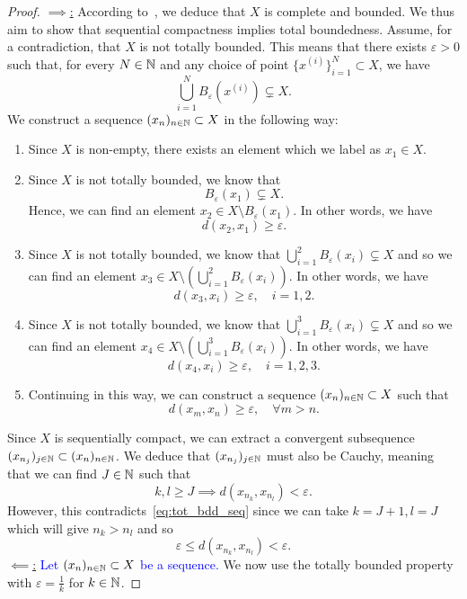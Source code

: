 \begin{proof}
	\ul{$\implies$:} According to~, we deduce that $X$ is complete and bounded. We thus aim to show that sequential compactness implies total boundedness. Assume, for a contradiction, that $X$ is not totally bounded. This means that there exists $\varepsilon>0$ such that, for every $N\in\mathbb{N}$ and any choice of point $\{x^{(i)}\}_{i=1}^N\subset X$, we have
	\[
	\bigcup_{i=1}^NB_\varepsilon(x^{(i)}) \subsetneq X.
	\]
	We construct a sequence $(x_n)_{n\in\mathbb{N}}\subset X$ in the following way:
	\begin{enumerate}
	\item Since $X$ is non-empty, there exists an element which we label as $x_1\in X$.
	\item Since $X$ is not totally bounded, we know that
	\[
	B_\varepsilon(x_1)\subsetneq X.
	\]
	Hence, we can find an element $x_2 \in X \setminus B_\varepsilon(x_1)$. In other words, we have
	\[
	d(x_2,x_1)\ge \varepsilon.
	\]
	\item Since $X$ is not totally bounded, we know that $\bigcup_{i=1}^2B_\varepsilon(x_i) \subsetneq X$ and so we can find an element $x_3\in X\setminus (\bigcup_{i=1}^2B_\varepsilon(x_i))$. In other words, we have
	\[
	d(x_3,x_i) \ge \varepsilon,\quad i=1,2.
	\]
	\item Since $X$ is not totally bounded, we know that $\bigcup_{i=1}^3B_\varepsilon(x_i) \subsetneq X$ and so we can find an element $x_4 \in X\setminus\left(\bigcup_{i=1}^3B_\varepsilon(x_i)\right)$. In other words, we have
	\[
	d(x_4,x_i) \ge \varepsilon,\quad i=1,2,3.
	\]
	\item Continuing in this way, we can construct a sequence $(x_n)_{n\in\mathbb{N}}\subset X$ such that
	\begin{equation}
	\label{eq:tot_bdd_seq}
	d(x_m,x_n) \ge \varepsilon,\quad \forall m > n.
	\end{equation}
	\end{enumerate}
	Since $X$ is sequentially compact, we can extract a convergent subsequence $(x_{n_j})_{j\in\mathbb{N}}\subset (x_n)_{n\in\mathbb{N}}$. We deduce that $(x_{n_j})_{j\in\mathbb{N}}$ must also be Cauchy, meaning that we can find $J\in\mathbb{N}$ such that
	\[
	k,l\ge J \implies d(x_{n_k},x_{n_l}) <\varepsilon.
	\]
	However, this contradicts~\eqref{eq:tot_bdd_seq} since we can take $k = J+1, l = J$ which will give $n_k > n_l$ and so
	\[
	\varepsilon \le d(x_{n_k},x_{n_l}) < \varepsilon.
	\]
	\ul{$\impliedby$:} \textcolor{blue}{Let $(x_n)_{n\in\mathbb{N}}\subset X$ be a sequence.} We now use the totally bounded property with $\varepsilon = \frac{1}{k}$ for $k\in \mathbb{N}$.

\end{proof}
